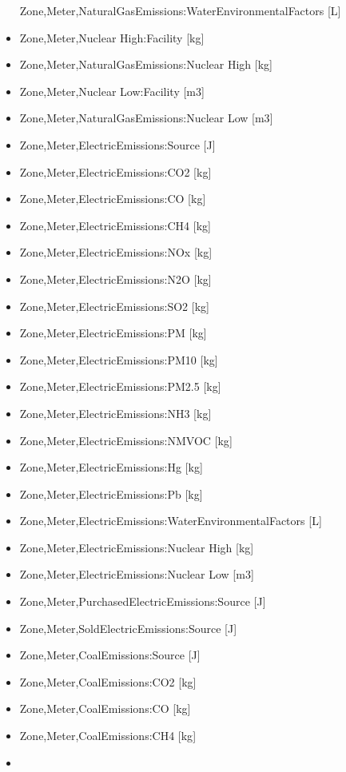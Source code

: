 \begin{itemize}
  Zone,Meter,NaturalGasEmissions:WaterEnvironmentalFactors {[}L{]}
\item
  Zone,Meter,Nuclear High:Facility {[}kg{]}
\item
  Zone,Meter,NaturalGasEmissions:Nuclear High {[}kg{]}
\item
  Zone,Meter,Nuclear Low:Facility {[}m3{]}
\item
  Zone,Meter,NaturalGasEmissions:Nuclear Low {[}m3{]}
\item
  Zone,Meter,ElectricEmissions:Source {[}J{]}
\item
  Zone,Meter,ElectricEmissions:CO2 {[}kg{]}
\item
  Zone,Meter,ElectricEmissions:CO {[}kg{]}
\item
  Zone,Meter,ElectricEmissions:CH4 {[}kg{]}
\item
  Zone,Meter,ElectricEmissions:NOx {[}kg{]}
\item
  Zone,Meter,ElectricEmissions:N2O {[}kg{]}
\item
  Zone,Meter,ElectricEmissions:SO2 {[}kg{]}
\item
  Zone,Meter,ElectricEmissions:PM {[}kg{]}
\item
  Zone,Meter,ElectricEmissions:PM10 {[}kg{]}
\item
  Zone,Meter,ElectricEmissions:PM2.5 {[}kg{]}
\item
  Zone,Meter,ElectricEmissions:NH3 {[}kg{]}
\item
  Zone,Meter,ElectricEmissions:NMVOC {[}kg{]}
\item
  Zone,Meter,ElectricEmissions:Hg {[}kg{]}
\item
  Zone,Meter,ElectricEmissions:Pb {[}kg{]}
\item
  Zone,Meter,ElectricEmissions:WaterEnvironmentalFactors {[}L{]}
\item
  Zone,Meter,ElectricEmissions:Nuclear High {[}kg{]}
\item
  Zone,Meter,ElectricEmissions:Nuclear Low {[}m3{]}
\item
  Zone,Meter,PurchasedElectricEmissions:Source {[}J{]}
\item
  Zone,Meter,SoldElectricEmissions:Source {[}J{]}
\item
  Zone,Meter,CoalEmissions:Source {[}J{]}
\item
  Zone,Meter,CoalEmissions:CO2 {[}kg{]}
\item
  Zone,Meter,CoalEmissions:CO {[}kg{]}
\item
  Zone,Meter,CoalEmissions:CH4 {[}kg{]}
\item

\end{itemize}
